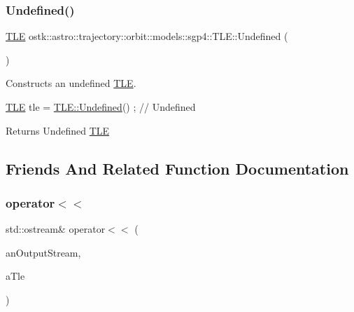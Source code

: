 \subsubsection{\texorpdfstring{Undefined()}{Undefined()}}
{\footnotesize\ttfamily \hyperlink{classostk_1_1astro_1_1trajectory_1_1orbit_1_1models_1_1sgp4_1_1_t_l_e}{T\+LE} ostk\+::astro\+::trajectory\+::orbit\+::models\+::sgp4\+::\+T\+L\+E\+::\+Undefined (\begin{DoxyParamCaption}{ }\end{DoxyParamCaption})\hspace{0.3cm}{\ttfamily [static]}}



Constructs an undefined \hyperlink{classostk_1_1astro_1_1trajectory_1_1orbit_1_1models_1_1sgp4_1_1_t_l_e}{T\+LE}. 


\begin{DoxyCode}
\hyperlink{classostk_1_1astro_1_1trajectory_1_1orbit_1_1models_1_1sgp4_1_1_t_l_e_a57323db2c24577c2e8ddce79fa776d1e}{TLE} tle = \hyperlink{classostk_1_1astro_1_1trajectory_1_1orbit_1_1models_1_1sgp4_1_1_t_l_e_a871cdedd5bc51c9f3afa976e0597ea51}{TLE::Undefined}() ; \textcolor{comment}{// Undefined}
\end{DoxyCode}


\begin{DoxyReturn}{Returns}
Undefined \hyperlink{classostk_1_1astro_1_1trajectory_1_1orbit_1_1models_1_1sgp4_1_1_t_l_e}{T\+LE} 
\end{DoxyReturn}


\subsection{Friends And Related Function Documentation}
\mbox{\label{classostk_1_1astro_1_1trajectory_1_1orbit_1_1models_1_1sgp4_1_1_t_l_e_a54a7a3bca65674d5052031634f900984}} 
\subsubsection{\texorpdfstring{operator$<$$<$}{operator<<}}
{\footnotesize\ttfamily std\+::ostream\& operator$<$$<$ (\begin{DoxyParamCaption}\item[{std\+::ostream \&}]{an\+Output\+Stream,  }\item[{const \hyperlink{classostk_1_1astro_1_1trajectory_1_1orbit_1_1models_1_1sgp4_1_1_t_l_e}{T\+LE} \&}]{a\+Tle }\end{DoxyParamCaption})\hspace{0.3cm}{\ttfamily [friend]}}



